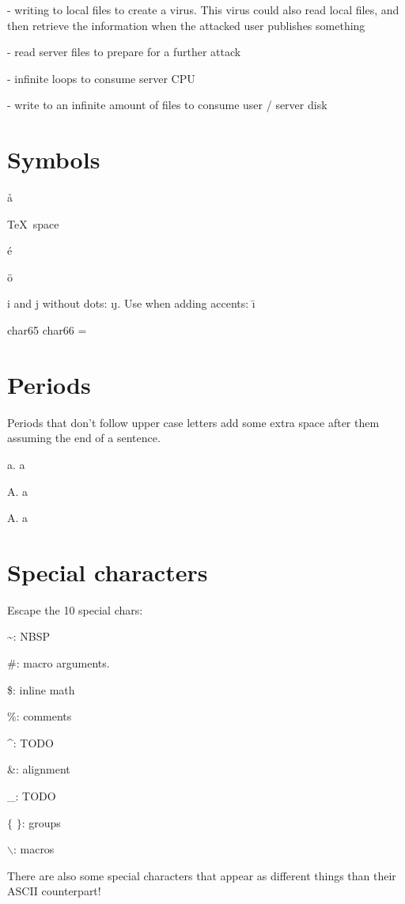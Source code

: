     - writing to local files to create a virus. This virus could also read local files, and then retrieve the information when the attacked user publishes something

    - read server files to prepare for a further attack

    - infinite loops to consume server CPU

    - write to an infinite amount of files to consume user / server disk

\section{Symbols}

  \aa

  \dag

  \TeX\ space

  \'e

  \"o

  i and j without dots: \i \j. Use when adding accents: \=\i

  char65 char66 = {}{}

  \section{Periods}

  Periods that don't follow upper case letters add some extra space after them assuming the end of a sentence.

  a. a

  A. a

  A\null. a

\section{Special characters}

  Escape the 10 special chars:

  \~{}: NBSP

  \#: macro arguments.

  \$: inline math

  \%: comments

  \^{}: TODO

  \&: alignment

  \_: TODO

  $\{$ $\}$: groups

  $\backslash$: macros

  There are also some special characters that appear as different things than their ASCII counterpart!

